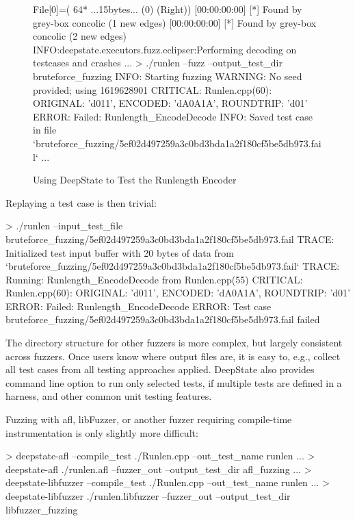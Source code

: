 \documentclass[sigconf]{acmart}
\begin{document}
\begin{figure}
{\begin{code}
  File[0]=( 64* ...15bytes... (0) (Right))
[00:00:00:00] [*] Found by grey-box concolic (1 new edges) 
[00:00:00:00] [*] Found by grey-box concolic (2 new edges) 
INFO:deepstate.executors.fuzz.eclipser:Performing decoding on testcases
  and crashes
...
> ./runlen --fuzz --output\_test\_dir bruteforce\_fuzzing
INFO: Starting fuzzing
WARNING: No seed provided; using 1619628901
CRITICAL: Runlen.cpp(60): ORIGINAL: 'd011', ENCODED: 'dA0A1A', ROUNDTRIP: 'd01'
ERROR: Failed: Runlength\_EncodeDecode
INFO: Saved test case in file
`bruteforce\_fuzzing/5ef02d497259a3c0bd3bda1a2f180cf5be5db973.fail`
...
\end{code}
}
\caption{Using DeepState to Test the Runlength Encoder}
\label{fig:rundeep}
\end{figure}

Replaying a test case is then trivial:

{\scriptsize
  \begin{code}
> ./runlen --input\_test\_file
    bruteforce\_fuzzing/5ef02d497259a3c0bd3bda1a2f180cf5be5db973.fail
TRACE: Initialized test input buffer with 20 bytes of data from
`bruteforce\_fuzzing/5ef02d497259a3c0bd3bda1a2f180cf5be5db973.fail`
TRACE: Running: Runlength\_EncodeDecode from Runlen.cpp(55)
CRITICAL: Runlen.cpp(60): ORIGINAL: 'd011', ENCODED: 'dA0A1A',
ROUNDTRIP: 'd01'
ERROR: Failed: Runlength\_EncodeDecode
ERROR: Test case
bruteforce\_fuzzing/5ef02d497259a3c0bd3bda1a2f180cf5be5db973.fail failed    
\end{code}
}

The directory structure for other fuzzers is more complex, but largely consistent across fuzzers.  Once users know where output files are, it is easy to, e.g., collect all test cases from all testing approaches applied.  DeepState also provides command line option to run only selected tests, if multiple tests are defined in a harness, and other common unit testing features.

Fuzzing with afl, libFuzzer, or another fuzzer requiring compile-time instrumentation is only slightly more difficult:

{\scriptsize
\begin{code}
> deepstate-afl --compile\_test ./Runlen.cpp --out\_test\_name runlen
...
> deepstate-afl ./runlen.afl --fuzzer\_out --output\_test\_dir afl\_fuzzing
...
> deepstate-libfuzzer --compile\_test ./Runlen.cpp --out\_test\_name runlen
...
> deepstate-libfuzzer ./runlen.libfuzzer --fuzzer\_out --output\_test\_dir
  libfuzzer\_fuzzing
\end{code}
}
\end{document}
